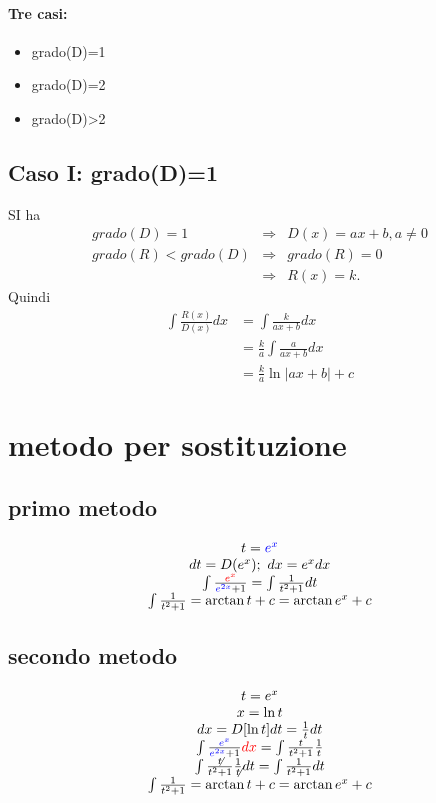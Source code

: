 \documentclass{article}
\newcommand{\abs}[1]{\lvert#1\rvert}
\begin{document}
\paragraph{Tre casi:}
\begin{itemize}
\item grado(D)=1
\item grado(D)=2
\item grado(D)>2
\end{itemize}
\subsection{Caso I: grado(D)=1}
SI ha 
\begin{eqnarray*}
	grado(D)=1& \Rightarrow & D(x)=ax+b, a\neq 0\\
	grado(R)<grado(D)&\Rightarrow & grado(R)=0\\
	&\Rightarrow&R(x)=k.
\end{eqnarray*}
Quindi
\begin{eqnarray*}
	\int \frac{R(x)}{D(x)}dx&=\int \frac{k}{ax+b}dx\\
					 &=\frac{k}{a}\int \frac{a}{ax+b}dx\\
					 &=\frac{k}{a}\ln\abs{ax+b}+c
\end{eqnarray*}
\section{metodo per sostituzione}
\subsection{primo metodo}
\begin{equation*}
	\begin{matrix}
		t={\color{blue} e^x}\\
		dt=D(e^x);\text{ } dx=e^xdx\\
		\int \frac{\color{red}e^x}{{\color{blue}e^{2x}} +1}=\int \frac{1}{t^2+1}dt\\
		\int \frac{1}{t^2+1}=\arctan t +c=\arctan e^x+c
	\end{matrix}
\end{equation*}
\subsection{secondo metodo}
\begin{equation*}
	\begin{matrix}
		t=e^x\\
		x=\ln t\\
		dx=D[\ln t]dt=\frac{1}{t}dt\\
		\int \frac{\color{blue}e^x}{{\color{blue}e^{2x}}+1}{\color{red}dx}=\int\frac{t}{t^2+1}\frac{1}{t}\\
		\int\frac{\not{t}}{t^2+1}\frac{1}{\not{t}}dt=\int\frac{1}{t^2+1}dt\\
		\int \frac{1}{t^2+1}=\arctan t +c=\arctan e^x+c
	\end{matrix}
\end{equation*}
\end{document}
